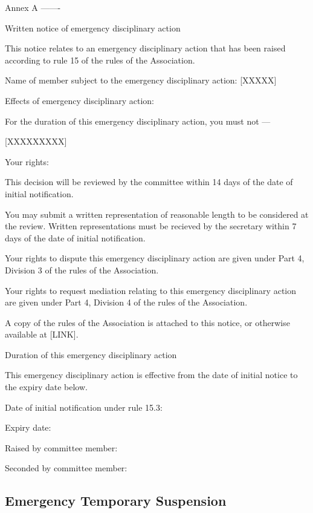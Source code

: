 \documentclass[../constitution.tex]{subfiles}
\begin{document}
Annex A
-------

Written notice of emergency disciplinary action

This notice relates to an emergency disciplinary action that has been raised according to rule 15 of the rules of the Association.

Name of member subject to the emergency disciplinary action: [XXXXX]

Effects of emergency disciplinary action:

For the duration of this emergency disciplinary action, you must not ---

[XXXXXXXXX]

Your rights:

This decision will be reviewed by the committee within 14 days of the date of initial notification.

You may submit a written representation of reasonable length to be considered at the review. Written representations must be recieved by the secretary within 7 days of the date of initial notification.

Your rights to dispute this emergency disciplinary action are given under Part 4, Division 3 of the rules of the Association.

Your rights to request mediation relating to this emergency disciplinary action are given under Part 4, Division 4 of the rules of the Association.

A copy of the rules of the Association is attached to this notice, or otherwise available at [LINK].


Duration of this emergency disciplinary action

This emergency disciplinary action is effective from the date of initial notice to the expiry date below.

Date of initial notification under rule 15.3:

Expiry date:

Raised by committee member:

Seconded by committee member:



\hypertarget{emergency-temporary-suspension}{%
\subsection{Emergency Temporary Suspension}\label{emergency-temporary-suspension}}

\end{document}
